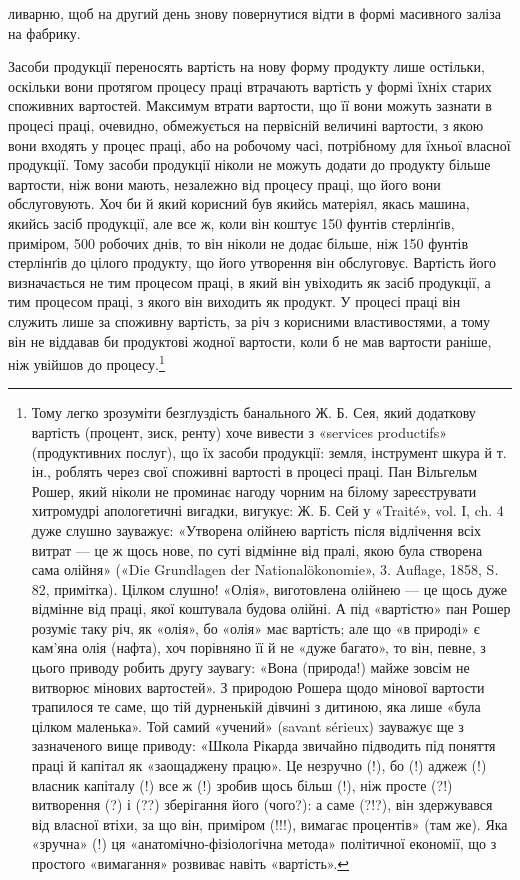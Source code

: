 \parcont{}  %
ливарню, щоб на другий день знову повернутися відти в формі
масивного заліза на фабрику.

Засоби продукції переносять вартість на нову форму продукту
лише остільки, оскільки вони протягом процесу праці втрачають
вартість у формі їхніх старих споживних вартостей. Максимум
втрати вартости, що її вони можуть зазнати в процесі праці, очевидно,
обмежується на первісній величині вартости, з якою вони
входять у процес праці, або на робочому часі, потрібному для
їхньої власної продукції. Тому засоби продукції ніколи не можуть
додати до продукту більше вартости, ніж вони мають, незалежно
від процесу праці, що його вони обслуговують. Хоч би й який
корисний був якийсь матеріял, якась машина, якийсь засіб продукції,
але все ж, коли він коштує 150 фунтів стерлінґів, приміром,
500 робочих днів, то він ніколи не додає більше, ніж 150 фунтів
стерлінґів до цілого продукту, що його утворення він обслуговує.
Вартість його визначається не тим процесом праці, в який
він увіходить як засіб продукції, а тим процесом праці, з якого
він виходить як продукт. У процесі праці він служить лише за
споживну вартість, за річ з корисними властивостями, а тому він
не віддавав би продуктові жодної вартости, коли б не мав вартости
раніше, ніж увійшов до процесу.\footnote{
Тому легко зрозуміти безглуздість банального Ж. Б. Сея, який додаткову
вартість (процент, зиск, ренту) хоче вивести з «services productifs»
(продуктивних послуг), що їх засоби продукції: земля, інструмент
шкура й т. ін., роблять через свої споживні вартості в процесі праці.
Пан Вільгельм Рошер, який ніколи не проминає нагоду чорним на білому
зареєструвати хитромудрі апологетичні вигадки, вигукує: Ж. Б. Сей
у «Traité», vol. І, ch. 4 дуже слушно зауважує: «Утворена олійнею вартість
після відлічення всіх витрат — це ж щось нове, по суті відмінне від
пралі, якою була створена сама олійня» («Die Grundlagen der Nationalökonomie»,
3. Auflage, 1858, S. 82, примітка). Цілком слушно! «Олія»,
виготовлена олійнею — це щось дуже відмінне від праці, якої коштувала
будова олійні. А під «вартістю» пан Рошер розуміє таку річ, як «олія»,
бо «олія» має вартість; але що «в природі» є кам’яна олія (нафта), хоч
порівняно її й не «дуже багато», то він, певне, з цього приводу робить
другу заувагу: «Вона (природа!) майже зовсім не витворює мінових
вартостей». З природою Рошера щодо мінової вартости трапилося те саме,
що тій дурненькій дівчині з дитиною, яка лише «була цілком маленька».
Той самий «учений» (savant sérieux) зауважує ще з зазначеного вище
приводу: «Школа Рікарда звичайно підводить під поняття праці й капітал
як «заощаджену працю». Це незручно (!), бо (!) аджеж (!) власник капіталу
(!) все ж (!) зробив щось більш (!), ніж просте (?!) витворення (?)
і (??) зберігання його (чого?): а саме (?!?), він здержувався від власної
втіхи, за що він, приміром (!!!), вимагає процентів» (там же). Яка «зручна»
(!) ця «анатомічно-фізіологічна метода» політичної економії, що з
простого «вимагання» розвиває навіть «вартість».
}

